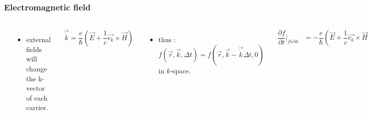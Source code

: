 \documentclass{beamer}
\begin{document}
\begin{frame}
\frametitle{Electromagnetic field}
\begin{columns}
\pause
\includegraphics[scale=.4]{electromagnetic}
\begin{itemize}
\pause
\item external fields will change the k-vector of each carrier.
\end{itemize}
\pause
\begin{align*}
\vec{\dot{k}} = \dfrac{e}{\hslash} (\vec{E}+\dfrac{1}{c} \vec{v_k}\times \vec{H})
\end{align*}
\pause
\begin{itemize}
\item thus : $f (\vec{r},\vec{k},\Delta t) = f (\vec{r},\vec{k}-\vec{\dot{k}}\Delta t,0)$ in $k$-space.
\end{itemize}
\pause
\begin{align*}
\dfrac{\partial f}{\partial t}\Big| _{field} &= -\dfrac{e}{\hslash} (\vec{E}+\dfrac{1}{c} \vec{v_k}\times \vec{H}) .\nabla_k f
\end{align*}
\end{columns}
\end{frame}
\end{document}
